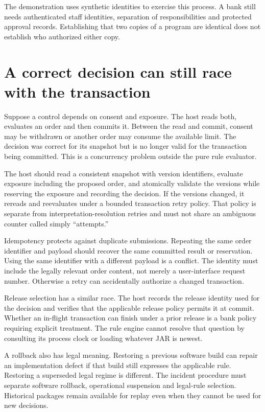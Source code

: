 The demonstration uses synthetic identities to exercise this process. A bank
still needs authenticated staff identities, separation of responsibilities and
protected approval records. Establishing that two copies of a program are
identical does not establish who authorized either copy.

\section{A correct decision can still race with the transaction}
\label{merge:M07:13}


Suppose a control depends on consent and exposure. The host reads both, evaluates
an order and then commits it. Between the read and commit, consent may be
withdrawn or another order may consume the available limit. The decision was
correct for its snapshot but is no longer valid for the transaction being
committed. This is a concurrency problem outside the pure rule evaluator.

The host should read a consistent snapshot with version identifiers, evaluate
exposure including the proposed order, and atomically validate the versions while
reserving the exposure and recording the decision. If the versions changed, it
rereads and reevaluates under a bounded transaction retry policy. That policy is
separate from interpretation-resolution retries and must not share an ambiguous
counter called simply ``attempts.''


Idempotency protects against duplicate submissions. Repeating the same order
identifier and payload should recover the same committed result or reservation.
Using the same identifier with a different payload is a conflict. The identity
must include the legally relevant order content, not merely a user-interface
request number. Otherwise a retry can accidentally authorize a changed transaction.

Release selection has a similar race. The host records the release identity used
for the decision and verifies that the applicable release policy permits it at
commit. Whether an in-flight transaction can finish under a prior release is a
bank policy requiring explicit treatment. The rule engine cannot resolve that
question by consulting its process clock or loading whatever JAR is newest.

A rollback also has legal meaning. Restoring a previous software build can repair
an implementation defect if that build still expresses the applicable rule.
Restoring a superseded legal regime is different. The incident procedure must
separate software rollback, operational suspension and legal-rule selection.
Historical packages remain available for replay even when they cannot be used for
new decisions.

